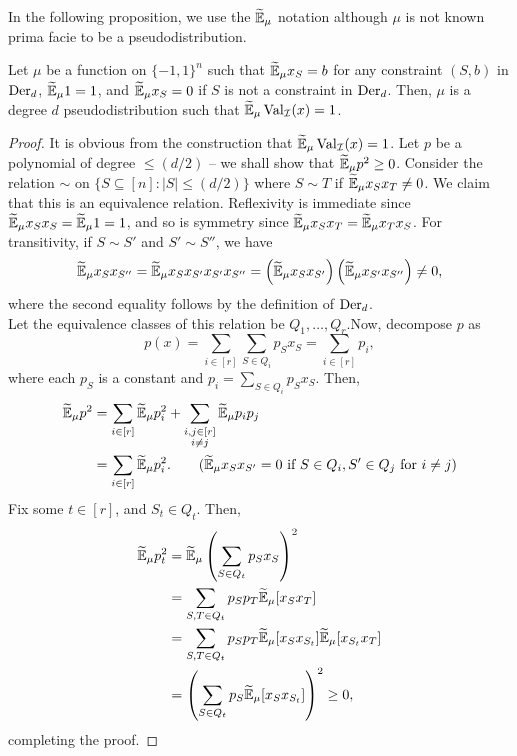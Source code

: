 	In the following proposition, we use the $\widetilde{\mathbb{E}}_\mu$ notation although $\mu$ is not known prima facie to be a pseudodistribution.
	\begin{fprop}
		Let $\mu$ be a function on $\{-1,1\}^n$ such that $\widetilde{\mathbb{E}}_\mu x_S = b$ for any constraint $(S,b)$ in $\operatorname{Der}_d$, $\widetilde{\mathbb{E}}_\mu 1 = 1$, and $\widetilde{\mathbb{E}}_\mu x_S = 0$ if $S$ is not a constraint in $\operatorname{Der}_d$. Then, $\mu$ is a degree $d$ pseudodistribution such that $\widetilde{\mathbb{E}}_\mu \operatorname{Val}_\mathcal{I}(x) = 1$.
	\end{fprop}
	\begin{proof}
		It is obvious from the construction that $\widetilde{\mathbb{E}}_\mu \operatorname{Val}_\mathcal{I}(x) = 1$. Let $p$ be a polynomial of degree $\le (d/2)$ -- we shall show that $\widetilde{\mathbb{E}}_\mu p^2 \ge 0$. Consider the relation $\sim$ on $\{S \subseteq [n] : |S| \le (d/2) \}$ where $S \sim T$ if $\widetilde{\mathbb{E}}_\mu x_S x_T \ne 0$. We claim that this is an equivalence relation. Reflexivity is immediate since $\widetilde{\mathbb{E}}_\mu x_S x_S = \widetilde{\mathbb{E}}_\mu 1 = 1$, and so is symmetry since $\widetilde{\mathbb{E}}_\mu x_S x_T = \widetilde{\mathbb{E}}_\mu x_T x_S$. For transitivity, if $S \sim S'$ and $S' \sim S''$, we have 
		\[ \widetilde{\mathbb{E}}_\mu x_S x_{S''} = \widetilde{\mathbb{E}}_\mu x_S x_{S'} x_{S'} x_{S''} = \left(\widetilde{\mathbb{E}}_\mu x_S x_{S'}\right) \left(\widetilde{\mathbb{E}}_\mu x_{S'} x_{S''}\right) \ne 0, \]
		where the second equality follows by the definition of $\operatorname{Der}_d$.\\ 
		Let the equivalence classes of this relation be $Q_1,\ldots,Q_r$.Now, decompose $p$ as
		\[ p(x) = \sum_{i \in [r]} \sum_{S \in Q_i} p_S x_S = \sum_{i \in [r]} p_i, \]
		where each $p_S$ is a constant and $p_i = \sum_{S \in Q_i} p_S x_S$. Then,
		\begin{align*}
			\widetilde{\mathbb{E}}_\mu p^2 &= \sum_{i \in [r]} \widetilde{\mathbb{E}}_\mu p_i^2 + \sum_{\substack{i,j \in [r] \\ i \ne j}} \widetilde{\mathbb{E}}_\mu  p_i p_j \\
				&= \sum_{i \in [r]} \widetilde{\mathbb{E}}_\mu p_i^2. \qquad \text{($\widetilde{\mathbb{E}}_\mu x_S x_{S'} = 0$ if $S \in Q_i, S' \in Q_j$ for $i \ne j$)}
		\end{align*}
		Fix some $t \in [r]$, and $S_t \in Q_t$. Then,
		\begin{align*}
			\widetilde{\mathbb{E}}_\mu p_t^2 &= \widetilde{\mathbb{E}}_\mu \left(\sum_{S \in Q_t} p_S x_S\right)^2 \\
				&= \sum_{S,T \in Q_t} p_S p_T \widetilde{\mathbb{E}}_\mu [x_S x_T] \\
				&= \sum_{S,T \in Q_t} p_S p_T \widetilde{\mathbb{E}}_\mu [x_S x_{S_t}] \widetilde{\mathbb{E}}_\mu [x_{S_t} x_T] \\
				&= \left(\sum_{S \in Q_t} p_S \widetilde{\mathbb{E}}_\mu [x_S x_{S_t}]\right)^2 \ge 0,
		\end{align*}
		completing the proof.
	\end{proof}
